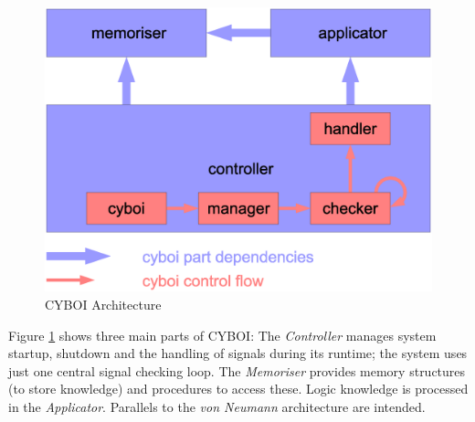 \begin{figure}[ht]
    \begin{center}
        \includegraphics[scale=0.2]{vector/dependencies.eps}
        \caption{CYBOI Architecture}
        \label{cyboi_figure}
    \end{center}
\end{figure}

Figure \ref{cyboi_figure} shows three main parts of CYBOI: The
\emph{Controller} manages system startup, shutdown and the handling of signals
during its runtime; the system uses just one central signal checking loop. The
\emph{Memoriser} provides memory structures (to store knowledge) and procedures
to access these. Logic knowledge is processed in the \emph{Applicator}.
Parallels to the \emph{von Neumann} architecture \cite{selflinux} are intended.
